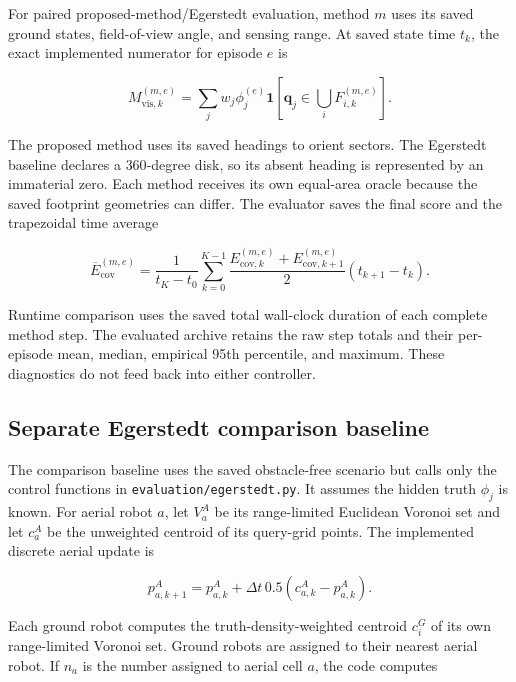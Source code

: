\documentclass[11pt]{article}
\begin{document}
For paired proposed-method/Egerstedt evaluation, method $m$ uses its saved
ground states, field-of-view angle, and sensing range. At saved state time
$t_k$, the exact implemented numerator for episode $e$ is

\begin{equation}
M_{\mathrm{vis},k}^{(m,e)}
=
\sum_j w_j\phi_j^{(e)}
\mathbf 1\!\left[
\mathbf q_j\in\bigcup_iF_{i,k}^{(m,e)}
\right].
\end{equation}

The proposed method uses its saved headings to orient sectors. The Egerstedt
baseline declares a $360$-degree disk, so its absent heading is represented by
an immaterial zero. Each method receives its own equal-area oracle because the
saved footprint geometries can differ. The evaluator saves the final score and
the trapezoidal time average

\begin{equation}
\overline E_{\mathrm{cov}}^{(m,e)}
=
\frac{1}{t_K-t_0}
\sum_{k=0}^{K-1}
\frac{
E_{\mathrm{cov},k}^{(m,e)}
+
E_{\mathrm{cov},k+1}^{(m,e)}
}{2}
(t_{k+1}-t_k).
\end{equation}

Runtime comparison uses the saved total wall-clock duration of each complete
method step. The evaluated archive retains the raw step totals and their
per-episode mean, median, empirical 95th percentile, and maximum. These
diagnostics do not feed back into either controller.


\subsection{Separate Egerstedt comparison baseline}


The comparison baseline uses the saved obstacle-free scenario but calls only
the control functions in \texttt{evaluation/egerstedt.py}. It assumes the
hidden truth $\phi_j$ is known. For aerial robot $a$, let $V^A_a$ be its
range-limited Euclidean Voronoi set and let $c^A_a$ be the unweighted centroid
of its query-grid points. The implemented discrete aerial update is


\begin{equation}
p^A_{a,k+1}
=
p^A_{a,k}
+
\Delta t\,0.5\left(c^A_{a,k}-p^A_{a,k}\right).
\end{equation}


Each ground robot computes the truth-density-weighted centroid $c^G_i$ of its
own range-limited Voronoi set. Ground robots are assigned to their nearest
aerial robot. If $n_a$ is the number assigned to aerial cell $a$, the code
computes
\end{document}
